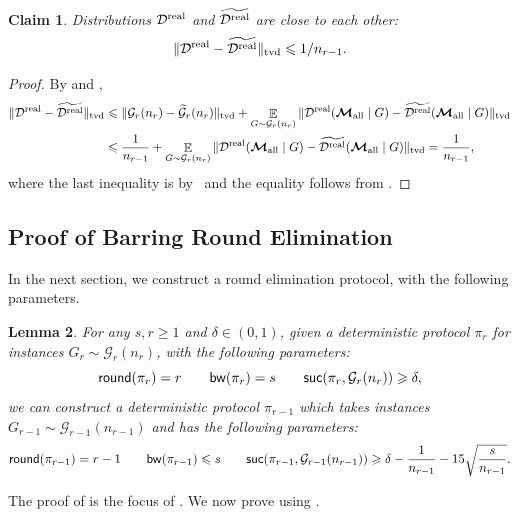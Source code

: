 \documentclass[11pt]{article}
\newtheorem{lemma}{Lemma}[section]
\newtheorem{claim}[lemma]{Claim}
\theoremstyle{definition}
\renewcommand{\leq}{\leqslant}
\renewcommand{\geq}{\geqslant}
\newcommand{\tvd}[2]{\ensuremath{\norm{#1 - #2}_{\mathrm{tvd}}}}
\newcommand{\norm}[1]{\ensuremath{\|#1\|}}
\DeclareMathOperator*{\Exp}{\ensuremath{{\mathbb{E}}}}
\newcommand{\prot}{\ensuremath{\pi}}
\newcommand{\suc}{\ensuremath{\textnormal{\textsf{suc}}}}
\newcommand{\round}{\ensuremath{\textnormal{\textsf{round}}}}
\newcommand{\bwidth}{\ensuremath{\textnormal{\textsf{bw}}}}
\newcommand{\cD}{\ensuremath{\mathcal{D}}}
\newcommand{\cG}{\ensuremath{\mathcal{G}}}
\newcommand{\cGtil}{\ensuremath{\widetilde{\cG}}}
\newcommand{\cDreal}{\ensuremath{\cD^{\textnormal{real}}}}
\newcommand{\cDrealtil}{\ensuremath{\widetilde{\cDreal}}}
\newcommand{\rmsgall}{\ensuremath{\bm{\mathcal{M}}_{\textnormal{all}}}}
\begin{document}
\begin{claim}\label{clm:Dreal-Drealtil-close}
	Distributions $\cDreal$ and $\cDrealtil$ are close to each other:
	\[
		\tvd{\cDreal}{\cDrealtil} \leq 1/n_{r-1}.
	\]
\end{claim}
\begin{proof}
	By  and , 
	\begin{align*}
		\tvd{\cDreal}{\cDrealtil} &\leq \tvd{\cG_r(n_r)}{\cGtil_r(n_r)} + \Exp_{G \sim \cG_r(n_r)} \tvd{\cDreal(\rmsgall \mid G)}{\cDrealtil(\rmsgall \mid G)}  \\
		&\leq \frac1{n_{r-1}} +  \Exp_{G \sim \cG_r(n_r)} \tvd{\cDreal(\rmsgall \mid G)}{\cDrealtil(\rmsgall \mid G)}   = \frac1{n_{r-1}} ,
	\end{align*}
where the last inequality is by~ and the equality follows from .
\end{proof}

\subsection{Proof of  Barring Round Elimination}\label{sec:proof-hard-dist}

In the next section, we construct a round elimination protocol, with the following parameters. 

\begin{lemma}\label{lem:round-elim}
	For any $s,r \geq 1$ and $\delta \in (0,1)$, 
	given a deterministic protocol $\prot_r$ for instances $G_r \sim \cG_r(n_r)$, with the following parameters:
	\begin{equation*}
		\round(\prot_r) = r \qquad \bwidth(\prot_r) = s \qquad \suc(\prot_r, \cG_r(n_r))\geq \delta, 
	\end{equation*}
	we can construct a deterministic protocol $\prot_{r-1}$ which takes instances  $G_{r-1} \sim \cG_{r-1}(n_{r-1})$ and has the following parameters:
	\begin{equation*}
		\round(\prot_{r-1}) = r-1 \qquad \bwidth(\prot_{r-1}) \leq s \qquad \suc(\prot_{r-1}, \cG_{r-1}(n_{r-1}))\geq \delta - \frac1{n_{r-1}} - 15 \sqrt{\frac{s}{n_{r-1}}}.
	\end{equation*}
\end{lemma}

The proof of  is the focus of . We now prove  using .
\end{document}
